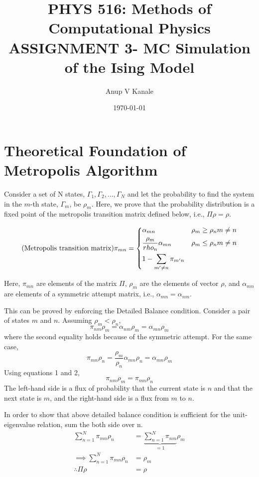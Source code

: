 \documentclass[11pt, oneside]{article}   	%
\title{\vspace{-6ex}\large PHYS 516: Methods of Computational Physics \\
  \normalsize ASSIGNMENT 3- MC Simulation of the Ising Model}
\author{Anup V Kanale}
\date{\vspace{-3ex}\today}							%
\begin{document}
\maketitle
\section{Theoretical Foundation of Metropolis Algorithm}
Consider a set of N states, {$\Gamma_1, \Gamma_2, ..., \Gamma_N$} and let the probability to find the system in the $m$-th state, $\Gamma_m$, be $\rho_m$. Here, we prove that the probability distribution is a fixed point of the metropolis transition matrix defined below, i.e., $\Pi \rho = \rho$.

\[
\text{(Metropolis transition matrix)} \pi_{mn}= 
\begin{dcases}
	\alpha_{mn} & \rho_m \geq \rho_n m \neq n \\
    \frac{\rho_m}{rho_n} \alpha_{mn} & \rho_m \leq \rho_n m \neq n \\
    1- \sum\limits_{m' \neq n} \pi_{m'n}
\end{dcases}
\]

Here, $\pi_{mn}$ are elements of the matrix $\Pi$, $\rho_m$ are the elements of vector $\rho$, and $\alpha_{mn}$ are elements of a symmetric attempt matrix, i.e., $\alpha_{mn}= \alpha_{nm}$.

This can be proved by enforcing the Detailed Balance condition. Consider a pair of states $m$ and $n$. Assuming $\rho_m < \rho_n$, 
	\begin{equation}
	\pi_{nm} \rho_m = \alpha_{nm} \rho_m = \alpha_{mn} \rho_m
	\end{equation}
where the second equality holds because of the symmetric attempt.
For the same case,
	\begin{equation}
	\pi_{mn} \rho_n = \frac{\rho_m}{\rho_n} \alpha_{mn} \rho_n = \alpha_{mn} \rho_m
	\end{equation}
Using equations 1 and 2,
	\begin{equation}
	\pi_{nm} \rho_m = \pi_{mn} \rho_n
	\end{equation}
The left-hand side is a flux of probability that the current state is $n$ and that the next state is $m$, and the right-hand side is a flux from $m$ to $n$.

In order to show that above detailed balance condition is sufficient for the unit-eigenvalue relation, sum
the both side over n.
	\begin{align}
	\sum\limits_{n=1}^{N} \pi_{mn} \rho_n &= \underbrace{\sum\limits_{n=1}^{N} \pi_{nm}}_{=1} \rho_m \\
	\implies \sum\limits_{n=1}^{N} \pi_{mn} \rho_n &= \rho_m \\
	\therefore \Pi \rho &= \rho
	\end{align}
	
\end{document}
